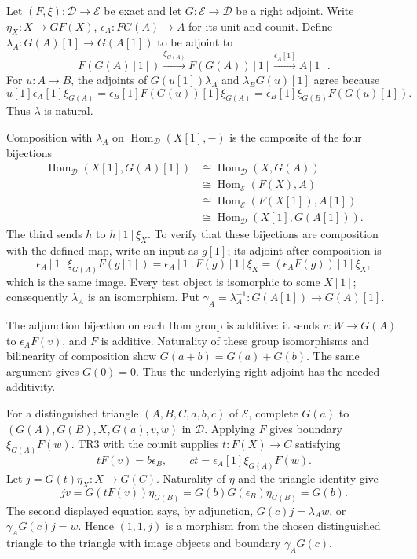 Let \((F,\xi):\mathcal D\to\mathcal E\) be exact and let \(G:\mathcal E\to\mathcal D\) be a right adjoint. Write \(\eta_X:X\to GF(X)\),\allowbreak{} \(\epsilon_A:FG(A)\to A\) for its unit and counit. Define \(\lambda_A:G(A)[1]\to G(A[1])\) to be adjoint to \[
F(G(A)[1])\xrightarrow{\xi_{G(A)}}F(G(A))[1]
\xrightarrow{\epsilon_A[1]}A[1].
\] For \(u:A\to B\),\allowbreak{} the adjoints of \(G(u[1])\lambda_A\) and \(\lambda_B G(u)[1]\) agree because \[
u[1]\epsilon_A[1]\xi_{G(A)}
=\epsilon_B[1]F(G(u))[1]\xi_{G(A)}
=\epsilon_B[1]\xi_{G(B)}F(G(u)[1]).
\] Thus \(\lambda\) is natural.

Composition with \(\lambda_A\) on \(\operatorname{Hom}_{\mathcal D}(X[1],-)\) is the composite of the four bijections \[
\begin{split}
\operatorname{Hom}_{\mathcal D}(X[1],G(A)[1])
&\cong\operatorname{Hom}_{\mathcal D}(X,G(A))\\
&\cong\operatorname{Hom}_{\mathcal E}(F(X),A)\\
&\cong\operatorname{Hom}_{\mathcal E}(F(X[1]),A[1])\\
&\cong\operatorname{Hom}_{\mathcal D}(X[1],G(A[1])).
\end{split}
\] The third sends \(h\) to \(h[1]\xi_X\). To verify that these bijections are composition with the defined map,\allowbreak{} write an input as \(g[1]\); its adjoint after composition is \[
\epsilon_A[1]\xi_{G(A)}F(g[1])
=\epsilon_A[1]F(g)[1]\xi_X
=(\epsilon_AF(g))[1]\xi_X,
\] which is the same image. Every test object is isomorphic to some \(X[1]\); consequently \(\lambda_A\) is an isomorphism. Put \(\gamma_A=\lambda_A^{-1}:G(A[1])\to G(A)[1]\).

The adjunction bijection on each Hom group is additive:\allowbreak{} it sends \(v:W\to G(A)\) to \(\epsilon_AF(v)\),\allowbreak{} and \(F\) is additive. Naturality of these group isomorphisms and bilinearity of composition show \(G(a+b)=G(a)+G(b)\). The same argument gives \(G(0)=0\). Thus the underlying right adjoint has the needed additivity.

For a distinguished triangle \((A,B,C,a,b,c)\) of \(\mathcal E\),\allowbreak{} complete \(G(a)\) to \((G(A),G(B),X,G(a),v,w)\) in \(\mathcal D\). Applying \(F\) gives boundary \(\xi_{G(A)}F(w)\). TR3 with the counit supplies \(t:F(X)\to C\) satisfying \[
tF(v)=b\epsilon_B,\qquad ct=\epsilon_A[1]\xi_{G(A)}F(w).
\] Let \(j=G(t)\eta_X:X\to G(C)\). Naturality of \(\eta\) and the triangle identity give \[
jv=G(tF(v))\eta_{G(B)}
=G(b)G(\epsilon_B)\eta_{G(B)}=G(b).
\] The second displayed equation says,\allowbreak{} by adjunction,\allowbreak{} \(G(c)j=\lambda_Aw\),\allowbreak{} or \(\gamma_AG(c)j=w\). Hence \((1,1,j)\) is a morphism from the chosen distinguished triangle to the triangle with image objects and boundary \(\gamma_AG(c)\).

